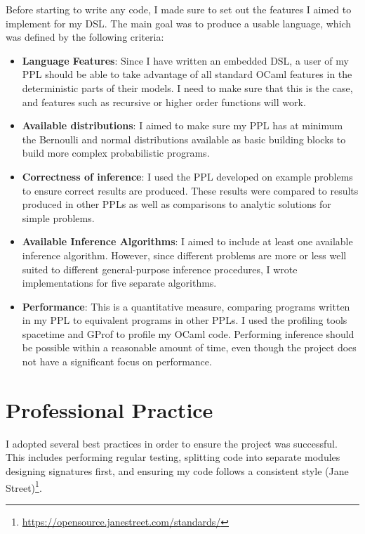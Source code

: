 Before starting to write any code, I made sure to set out the features I aimed to implement for my DSL. The main goal was to produce a usable language, which was defined by the following criteria:

\begin{itemize}
	\item \textbf{Language Features}: Since I have written an embedded DSL, a user of my PPL should be able to take advantage of all standard OCaml features in the deterministic parts of their models. I need to make sure that this is the case, and features such as recursive or higher order functions will work.
	\item \textbf{Available distributions}: I aimed to make sure my PPL has at minimum the Bernoulli and normal distributions available as basic building blocks to build more complex probabilistic programs.
	\item \textbf{Correctness of inference}: I used the PPL developed on example problems to ensure correct results are produced. These results were compared to results produced in other PPLs as well as comparisons to analytic solutions for simple problems.
	\item \textbf{Available Inference Algorithms}: I aimed to include at least one available inference algorithm. However, since different problems are more or less well suited to different general-purpose inference procedures, I wrote implementations for five separate algorithms.
	\item \textbf{Performance}: This is a quantitative measure, comparing programs written in my PPL to equivalent programs in other PPLs. I used the profiling tools spacetime and GProf to profile my OCaml code. Performing inference should be possible within a reasonable amount of time, even though the project does not have a significant focus on performance.
\end{itemize}

\section{Professional Practice}

I adopted several best practices in order to ensure the project was successful. This includes performing regular testing, splitting code into separate modules designing signatures first, and ensuring my code follows a consistent style (Jane Street)\footnote{\url{https://opensource.janestreet.com/standards/}}.

